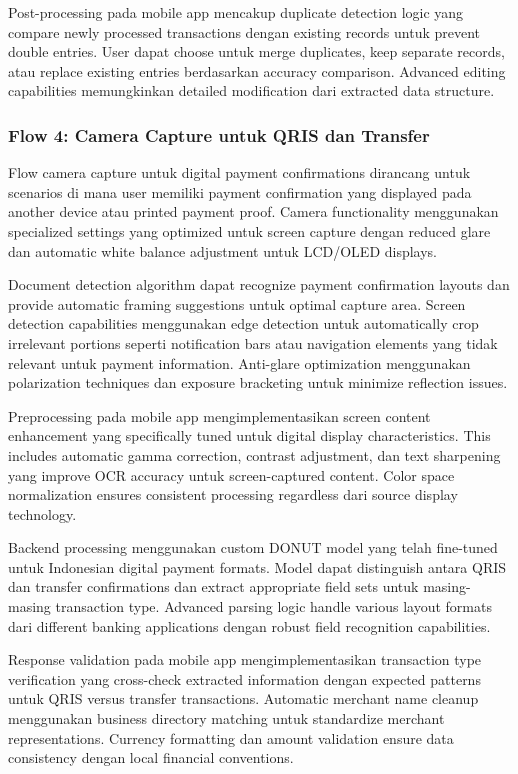 Post-processing pada mobile app mencakup duplicate detection logic yang compare newly processed transactions dengan existing records untuk prevent double entries. User dapat choose untuk merge duplicates, keep separate records, atau replace existing entries berdasarkan accuracy comparison. Advanced editing capabilities memungkinkan detailed modification dari extracted data structure.

\subsubsection{Flow 4: Camera Capture untuk QRIS dan Transfer}
\label{subsubsec:flow-camera-digital}

Flow camera capture untuk digital payment confirmations dirancang untuk scenarios di mana user memiliki payment confirmation yang displayed pada another device atau printed payment proof. Camera functionality menggunakan specialized settings yang optimized untuk screen capture dengan reduced glare dan automatic white balance adjustment untuk LCD/OLED displays.

Document detection algorithm dapat recognize payment confirmation layouts dan provide automatic framing suggestions untuk optimal capture area. Screen detection capabilities menggunakan edge detection untuk automatically crop irrelevant portions seperti notification bars atau navigation elements yang tidak relevant untuk payment information. Anti-glare optimization menggunakan polarization techniques dan exposure bracketing untuk minimize reflection issues.

Preprocessing pada mobile app mengimplementasikan screen content enhancement yang specifically tuned untuk digital display characteristics. This includes automatic gamma correction, contrast adjustment, dan text sharpening yang improve OCR accuracy untuk screen-captured content. Color space normalization ensures consistent processing regardless dari source display technology.

Backend processing menggunakan custom DONUT model yang telah fine-tuned untuk Indonesian digital payment formats. Model dapat distinguish antara QRIS dan transfer confirmations dan extract appropriate field sets untuk masing-masing transaction type. Advanced parsing logic handle various layout formats dari different banking applications dengan robust field recognition capabilities.

Response validation pada mobile app mengimplementasikan transaction type verification yang cross-check extracted information dengan expected patterns untuk QRIS versus transfer transactions. Automatic merchant name cleanup menggunakan business directory matching untuk standardize merchant representations. Currency formatting dan amount validation ensure data consistency dengan local financial conventions.

